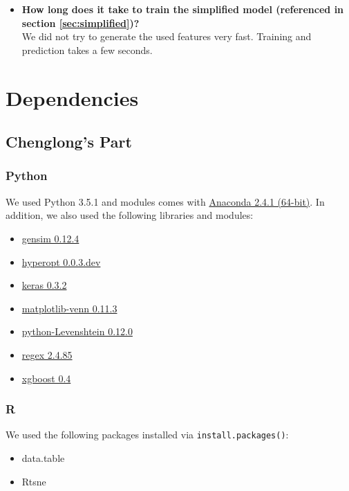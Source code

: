 \documentclass[12pt]{article}
\begin{document}
{{\begin{appendices}
\begin{itemize}
Igor\&Kostia: Text processing and feature generation takes a few days.  Prediction and training for a single model can take from $\sim 5$ minutes (xgboost) to $\sim 5$ hours (SVR).

\item \textbf{How long does it take to train the simplified model (referenced in section \ref{sec:simplified})?}\\
We did not try to generate the used features very fast. Training and prediction takes a few seconds.

\end{itemize}





\section{Dependencies}
\label{sec:dependencies}
\subsection{Chenglong's Part}
\label{subsec:Dependencies_Chenglong}
\subsubsection{Python}
We used Python 3.5.1 and modules comes with \href{https://repo.continuum.io/archive/Anaconda3-2.4.1-Linux-x86\_64.sh}{Anaconda 2.4.1 (64-bit)}. In addition, we also used the following libraries and modules:
\begin{itemize}
\item \href{https://github.com/piskvorky/gensim/archive/0.12.4.tar.gz}{gensim 0.12.4}
\item \href{https://github.com/hyperopt/hyperopt}{hyperopt 0.0.3.dev}
\item \href{https://github.com/fchollet/keras/archive/0.3.2.tar.gz}{keras 0.3.2}
\item \href{https://pypi.python.org/pypi/matplotlib-venn}{matplotlib-venn 0.11.3}
\item \href{https://pypi.python.org/pypi/python-Levenshtein/0.12.0}{python-Levenshtein 0.12.0}
\item \href{https://pypi.python.org/pypi/regex}{regex 2.4.85}
\item \href{https://github.com/dmlc/xgboost/archive/v0.40.tar.gz}{xgboost 0.4}
\end{itemize}
\subsubsection{R}
We used the following packages installed via \texttt{install.packages()}:
\begin{itemize}
\item data.table
\item Rtsne
\end{itemize}

\end{appendices}}}
\end{document}
